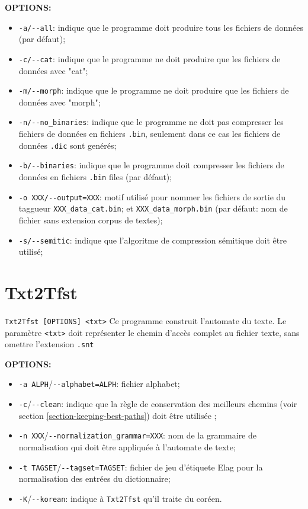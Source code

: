 \bigskip
\noindent \textbf{OPTIONS:}
\begin{itemize}
\item \verb+-a/--all+: indique que le programme doit produire tous les fichiers de données (par
		défaut);
\item \verb+-c/--cat+: indique que le programme ne doit produire que les fichiers de données avec
	"cat";
  \item \verb+-m/--morph+: indique que le programme ne doit produire que les fichiers de données
  	  avec "morph";
  \item \verb+-n/--no_binaries+: indique que le programme ne doit pas compresser les fichiers de
  	  données en fichiers \verb+.bin+, seulement dans ce cas les fichiers de données \verb+.dic+ sont genérés;
  \item \verb+-b/--binaries+: indique que le programme doit compresser les fichiers de données en
  	  fichiers \verb+.bin+ files (par défaut);
  \item \verb+-o XXX/--output=XXX+: motif utilisé pour nommer les fichiers de sortie du taggueur
  	  \verb+XXX_data_cat.bin+; et \verb+XXX_data_morph.bin+ (par défaut: nom de fichier sans
  	  	  extension corpus de textes);
  \item \verb+-s/--semitic+: indique que l'algoritme de compression sémitique doit être utilisé;
\end{itemize}

\bigskip

\section{Txt2Tfst} \verb+Txt2Tfst [OPTIONS] <txt>+
\bigskip
\noindent Ce programme construit l’automate du texte. Le paramètre \verb+<txt>+ doit représenter le
chemin d’accès complet au fichier texte, sans omettre l’extension \verb+.snt+


\bigskip
\noindent \textbf{OPTIONS:}
\begin{itemize}
  \item \verb+-a ALPH+/\verb+--alphabet=ALPH+: fichier alphabet;
  
  \item \verb+-c+/\verb+--clean+: indique que la règle de conservation des meilleurs chemins (voir
  		  section \ref{section-keeping-best-paths}) doit être utilisée ;
  
  \item \verb+-n XXX+/\verb+--normalization_grammar=XXX+: nom de la grammaire de normalisation
  	  qui doit être appliquée à l'automate de texte; 
  \item \verb+-t TAGSET+/\verb+--tagset=TAGSET+: fichier de jeu d'étiquete Elag pour la
  	  normalisation des entrées du dictionnaire;
  \item \verb+-K+/\verb+--korean+: indique à \verb+Txt2Tfst+ qu'il traite du coréen.

\end{itemize}


